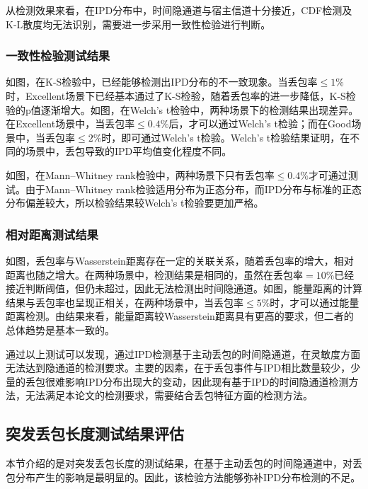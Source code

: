 从检测效果来看，在IPD分布中，时间隐通道与宿主信道十分接近，CDF检测及K-L散度均无法识别，需要进一步采用一致性检验进行判断。

\subsubsection{一致性检验测试结果}
\label{chap:analyze:result:ipd:statistical}

如图，在K-S检验中，已经能够检测出IPD分布的不一致现象。当丢包率$\le 1\%$时，Excellent场景下已经基本通过了K-S检验，随着丢包率的进一步降低，K-S检验的p值逐渐增大。如图，在Welch's t检验中，两种场景下的检测结果出现差异。在Excellent场景中，当丢包率$\le 0.4\%$后，才可以通过Welch's t检验；而在Good场景中，当丢包率$\le 2\%$时，即可通过Welch's t检验。Welch's t检验结果证明，在不同的场景中，丢包导致的IPD平均值变化程度不同。

如图，在Mann–Whitney rank检验中，两种场景下只有丢包率$\le 0.4\%$才可通过测试。由于Mann–Whitney rank检验适用分布为正态分布，而IPD分布与标准的正态分布偏差较大，所以检验结果较Welch's t检验要更加严格。

\subsubsection{相对距离测试结果}
\label{chap:analyze:result:ipd:distance}

如图，丢包率与Wasserstein距离存在一定的关联关系，随着丢包率的增大，相对距离也随之增大。在两种场景中，检测结果是相同的，虽然在丢包率$=10\%$已经接近判断阈值，但仍未超过，因此无法检测出时间隐通道。如图，能量距离的计算结果与丢包率也呈现正相关，在两种场景中，当丢包率$\le 5\%$时，才可以通过能量距离检测。由结果来看，能量距离较Wasserstein距离具有更高的要求，但二者的总体趋势是基本一致的。

通过以上测试可以发现，通过IPD检测基于主动丢包的时间隐通道，在灵敏度方面无法达到隐通道的检测要求。主要的因素，在于丢包事件与IPD相比数量较少，少量的丢包很难影响IPD分布出现大的变动，因此现有基于IPD的时间隐通道检测方法，无法满足本论文的检测要求，需要结合丢包特征方面的检测方法。

\subsection{突发丢包长度测试结果评估}
\label{chap:analyze:result:burst}

本节介绍的是对突发丢包长度的测试结果，在基于主动丢包的时间隐通道中，对丢包分布产生的影响是最明显的。因此，该检验方法能够弥补IPD分布检测的不足。

